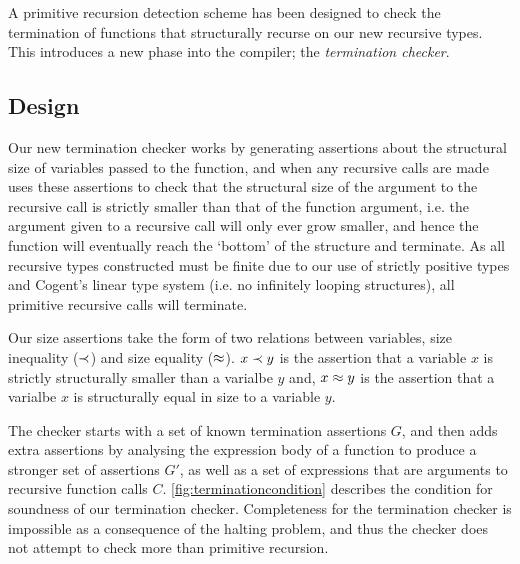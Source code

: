 A primitive recursion detection scheme has been designed to check the termination
of functions that structurally recurse on our new recursive types. This introduces
a new phase into the compiler; the \textit{termination checker}.

\subsection{Design}

Our new termination checker works by generating assertions about the structural
size of variables passed to the function, and when any recursive calls are made 
uses these assertions to check that the structural size of the argument to the
recursive call is strictly smaller than that of the function argument, i.e. the argument
given to a recursive call will only ever grow smaller, and hence the function will
eventually reach the `bottom' of the structure and terminate.
As all recursive types constructed must be finite due to our use of strictly positive
types and Cogent's linear type system (i.e. no infinitely looping structures),
all primitive recursive calls will terminate.

Our size assertions take the form of two relations between variables, 
size inequality ($\prec$) and size equality ($\approx$).
$x \prec y$ is the assertion that a variable $x$ is strictly
structurally smaller than a varialbe $y$ and, $x \approx y$ is the assertion that a
varialbe $x$ is structurally equal in size to a variable $y$.

The checker starts with a set of known termination assertions $G$, and then adds
extra assertions by analysing the expression body of a function to produce
a stronger set of assertions $G'$, as well as a set of expressions that are arguments
to recursive function calls $C$. \autoref{fig:terminationcondition} describes the
condition for soundness of our termination checker. Completeness for the termination
checker is impossible as a consequence of the halting problem, and thus the checker
does not attempt to check more than primitive recursion.


